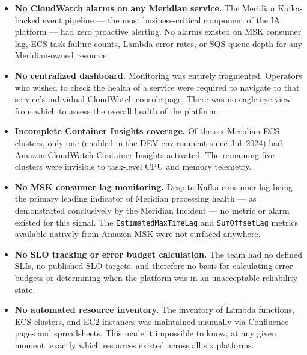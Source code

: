 \begin{itemize}
    \item \textbf{No CloudWatch alarms on any Meridian service.} The
          Meridian Kafka-backed event pipeline --- the most
          business-critical component of the IA platform --- had zero
          proactive alerting. No alarms existed on MSK consumer lag,
          ECS task failure counts, Lambda error rates, or SQS queue
          depth for any Meridian-owned resource.

    \item \textbf{No centralized dashboard.} Monitoring was entirely
          fragmented. Operators who wished to check the health of a
          service were required to navigate to that service's individual
          CloudWatch console page. There was no eagle-eye view
          from which to assess the overall health of the platform.

    \item \textbf{Incomplete Container Insights coverage.} Of the six
          Meridian ECS clusters, only one (enabled in the DEV environment
          since Jul~2024) had Amazon CloudWatch Container Insights activated. The
          remaining five clusters were invisible to task-level CPU and
          memory telemetry.

    \item \textbf{No MSK consumer lag monitoring.} Despite Kafka
          consumer lag being the primary leading indicator of Meridian
          processing health --- as demonstrated conclusively by the
          Meridian Incident --- no metric or alarm existed for this
          signal. The \texttt{EstimatedMaxTimeLag} and
          \texttt{SumOffsetLag} metrics available natively from Amazon
          MSK were not surfaced anywhere.

    \item \textbf{No SLO tracking or error budget calculation.}
          The team had no defined SLIs, no published SLO targets, and
          therefore no basis for calculating error budgets or
          determining when the platform was in an unacceptable
          reliability state.

    \item \textbf{No automated resource inventory.} The inventory of
          Lambda functions, ECS clusters, and EC2 instances was
          maintained manually via Confluence pages and spreadsheets.
          This made it impossible to know, at any given moment, exactly
          which resources existed across all six platforms.


\end{itemize}
